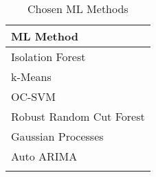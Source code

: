 \begin{table}[h]\centering
        \begin{tabular}{l}
            ML Method                                                                 \\\midrule                                                                               
            Isolation Forest                                                          \\\addlinespace
            k-Means                                                                   \\\addlinespace
            OC-SVM                                                                    \\\addlinespace
            Robust Random Cut Forest                                                  \\\addlinespace
            Gaussian Processes                                                        \\\addlinespace
            Auto ARIMA                                                                \\\addlinespace
        \end{tabular}
    \caption{Chosen ML Methods}\label{tab:chosen-packages}
\end{table}

